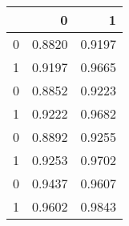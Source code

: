 \begin{tabular}{lrr}
\toprule
{} &       0 &       1 \\
\midrule
0 &  0.8820 &  0.9197 \\
1 &  0.9197 &  0.9665 \\
0 &  0.8852 &  0.9223 \\
1 &  0.9222 &  0.9682 \\
0 &  0.8892 &  0.9255 \\
1 &  0.9253 &  0.9702 \\
0 &  0.9437 &  0.9607 \\
1 &  0.9602 &  0.9843 \\
\bottomrule
\end{tabular}

